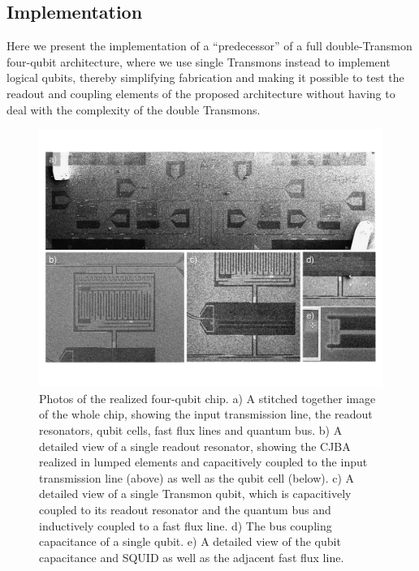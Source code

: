 \subsection{Implementation}

Here we present the implementation of a ``predecessor'' of a full double-Transmon four-qubit architecture, where we use single Transmons instead to implement logical qubits, thereby simplifying fabrication and making it possible to test the readout and coupling elements of the proposed architecture without having to deal with the complexity of the double Transmons.

\smallskip

\begin{figure}[ht!]
	\centering
	\includegraphics[width=\textwidth]{./material/figures/scalable-architecture/scalable_architecture_photos}
	\caption[]{Photos of the realized four-qubit chip. a) A stitched together image of the whole chip, showing the input transmission line, the readout resonators, qubit cells, fast flux lines and quantum bus. b) A detailed view of a single readout resonator, showing the CJBA realized in lumped elements and capacitively coupled to the input transmission line (above) as well as the qubit cell (below). c) A detailed view of a single Transmon qubit, which is capacitively coupled to its readout resonator and the quantum bus and inductively coupled to a fast flux line. d) The bus coupling capacitance of a single qubit. e) A detailed view of the qubit capacitance and SQUID as well as the adjacent fast flux line.}
	\label{fig:scalable_architecture_photos}
\end{figure}

